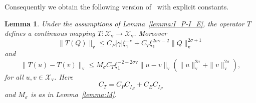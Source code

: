 \documentclass[11pt]{article}
\newcommand{\normv}{\mathrm{v}}
\newcommand{\Space}{\mathcal{X}}
\newtheorem{lemma}[definition]{Lemma}
\begin{document}
Consequently we obtain the following version of~\cite[Lemma
A.2]{Plech2001} with explicit constants.

\begin{lemma}\label{lemma:fixed-point-bounds}
  Under the assumptions of Lemma~\ref{lemma:I_P-I_E}, the operator
  \(T\) defines a continuous mapping
  \(T : \Space_\normv \to \Space_\normv\). Moreover
  \begin{equation}
    \label{eq:T-1}
    \|T(Q)\|_{\normv} \leq C_{P}|\gamma|\xi_{1}^{-\normv} + C_{T}\xi_{1}^{2\sigma \normv - 2}\|Q\|_{\normv}^{2\sigma + 1}
  \end{equation}
  and
  \begin{equation}
    \label{eq:T-2}
    \|T(u) - T(v)\|_{\normv} \leq M_{\sigma}C_{T}\xi_{1}^{-2 + 2\sigma \normv}\|u - v\|_{\normv}(\|u\|_{\normv}^{2\sigma} + \|v\|_{\normv}^{2\sigma}),
  \end{equation}
  for all \(u, v \in \Space_\normv\). Here
  \begin{equation*}
    C_{T} = C_{P}C_{I_{E}} + C_{E}C_{I_{P}}
  \end{equation*}
  and \(M_{\sigma}\) is as in Lemma~\ref{lemma:M}.
\end{lemma}
\end{document}
